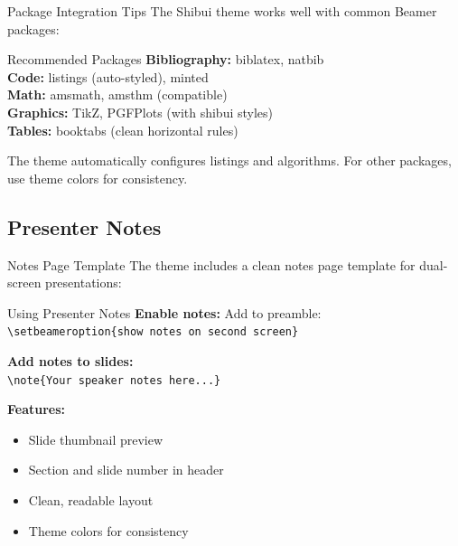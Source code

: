 \documentclass[aspectratio=169]{beamer}
\begin{document}
\begin{frame}[fragile]{Package Integration Tips}
  The Shibui theme works well with common Beamer packages:

  \vspace{0.5em}

  \begin{shibuiframe}{Recommended Packages}
    \textbf{Bibliography:} biblatex, natbib \\
    \textbf{Code:} listings (auto-styled), minted \\
    \textbf{Math:} amsmath, amsthm (compatible) \\
    \textbf{Graphics:} TikZ, PGFPlots (with shibui styles) \\
    \textbf{Tables:} booktabs (clean horizontal rules)
  \end{shibuiframe}

  \vspace{0.5em}

  \small The theme automatically configures listings and algorithms. For other packages, use theme colors for consistency.
\end{frame}

\subsection{Presenter Notes}

\begin{frame}{Notes Page Template}
  The theme includes a clean notes page template for dual-screen presentations:

  \vspace{0.5em}

  \begin{shibuiframe}{Using Presenter Notes}
    \textbf{Enable notes:} Add to preamble: \\
    \texttt{\textbackslash setbeameroption\{show notes on second screen\}}

    \vspace{0.3em}

    \textbf{Add notes to slides:} \\
    \texttt{\textbackslash note\{Your speaker notes here...\}}

    \vspace{0.3em}

    \textbf{Features:}
    \begin{itemize}
      \item Slide thumbnail preview
      \item Section and slide number in header
      \item Clean, readable layout
      \item Theme colors for consistency
    \end{itemize}
  \end{shibuiframe}
\end{frame}
\end{document}
